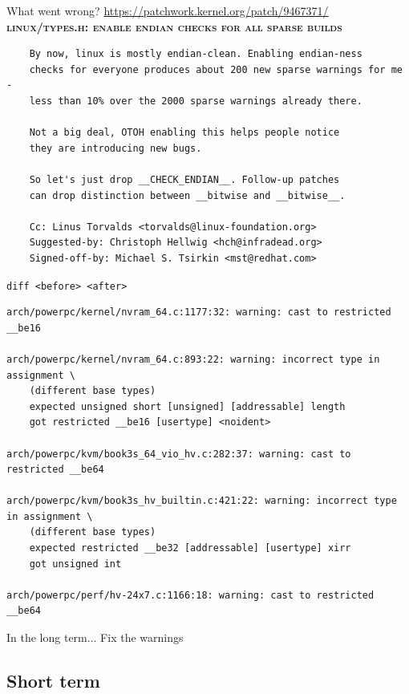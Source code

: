 \documentclass[pdf,aspectratio=169]{beamer}
\begin{document}
\begin{frame}[fragile]{What went wrong? {\small\url{https://patchwork.kernel.org/patch/9467371/}}}
    \textbf{\textsc{linux/types.h: enable endian checks for all sparse builds}}
\begin{verbatim}    
    By now, linux is mostly endian-clean. Enabling endian-ness
    checks for everyone produces about 200 new sparse warnings for me -
    less than 10% over the 2000 sparse warnings already there.
    
    Not a big deal, OTOH enabling this helps people notice
    they are introducing new bugs.
    
    So let's just drop __CHECK_ENDIAN__. Follow-up patches
    can drop distinction between __bitwise and __bitwise__.
    
    Cc: Linus Torvalds <torvalds@linux-foundation.org>
    Suggested-by: Christoph Hellwig <hch@infradead.org>
    Signed-off-by: Michael S. Tsirkin <mst@redhat.com>
\end{verbatim}
\end{frame}

\begin{frame}[fragile]{\verb~diff <before> <after>~}
\small
\begin{verbatim}
arch/powerpc/kernel/nvram_64.c:1177:32: warning: cast to restricted __be16

arch/powerpc/kernel/nvram_64.c:893:22: warning: incorrect type in assignment \
    (different base types)
    expected unsigned short [unsigned] [addressable] length 
    got restricted __be16 [usertype] <noident>

arch/powerpc/kvm/book3s_64_vio_hv.c:282:37: warning: cast to restricted __be64

arch/powerpc/kvm/book3s_hv_builtin.c:421:22: warning: incorrect type in assignment \
    (different base types) 
    expected restricted __be32 [addressable] [usertype] xirr 
    got unsigned int

arch/powerpc/perf/hv-24x7.c:1166:18: warning: cast to restricted __be64
\end{verbatim}
\end{frame}
\begin{frame}{In the long term...}
  Fix the warnings
\end{frame}

\subsection{Short term}
\label{sec-4-2}
\end{document}
